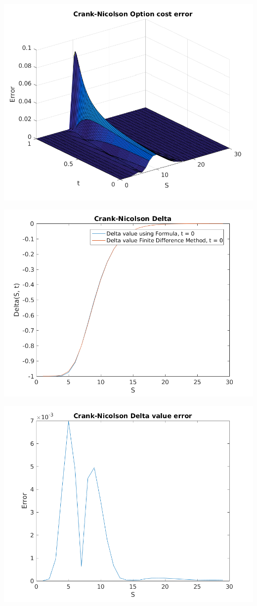 \documentclass{article}
\begin{document}
\includegraphics{"q2_25"}
\pagebreak


\includegraphics{"q2_26"}
\pagebreak


\includegraphics{"q2_27"}
\pagebreak
\end{document}

